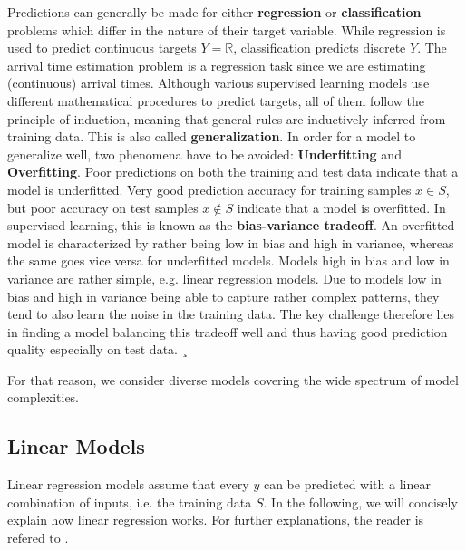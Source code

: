 Predictions can generally be made for either \textbf{regression} or \textbf{classification} problems which differ in the nature of their target variable. 
While regression is used to predict continuous targets $ Y = \mathbb{R} $, classification predicts discrete $ Y $. The arrival time estimation problem is a regression task since we are estimating (continuous) arrival times.
Although various supervised learning models use different mathematical procedures to predict targets, all of them follow the principle of induction, meaning that general rules are inductively inferred from training data. This is also called \textbf{generalization}.  
In order for a model to generalize well, two phenomena have to be avoided: \textbf{Underfitting} and \textbf{Overfitting}. 
Poor predictions on both the training and test data indicate that a model is underfitted. Very good prediction accuracy for training samples $ x \in S $, but poor accuracy on test samples $ x \notin S $ indicate that a model is overfitted.
In supervised learning, this is known as the \textbf{bias-variance tradeoff}. 
An overfitted model is characterized by rather being low in bias and high in variance, whereas the same goes vice versa for underfitted models. Models high in bias and low in variance are rather simple, e.g. linear regression models. Due to models low in bias and high in variance being able to capture rather complex patterns, they tend to also learn the noise in the training data. 
The key challenge therefore lies in finding a model balancing this tradeoff well and thus having good prediction quality especially on test data. ¸

For that reason, we consider diverse models covering the wide spectrum of model complexities.
 
\subsection{Linear Models}

Linear regression models assume that every $ y $ can be predicted with a linear combination of inputs, i.e. the training data $ S $. In the following, we will concisely explain how linear regression works. For further explanations, the reader is refered to \cite{friedman2001elements}.

